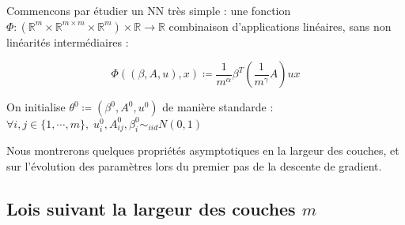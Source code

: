 \documentclass[a4paper, 11pt, french]{article}
\theoremstyle{definition}
\begin{document}
	Commencons par étudier un NN très simple : une fonction
	$\Phi : (\mathbb{R}^m \times \mathbb{R}^{m \times m} \times \mathbb{R}^m) \times \mathbb{R} \to \mathbb{R}$ combinaison d'applications linéaires, sans non linéarités  intermédiaires  :
	
	\[ \Phi ((\beta, A, u), x) \coloneqq \frac{1}{m^{\alpha}} \beta^T
		 \left( \frac{1}{m^{\gamma}} A \right) u x \]
		 
	On initialise $\theta^0 \coloneqq (\beta^0, A^0, u^0)$ de manière standarde : 
	$ \forall i,j \in \{1, \cdots, m\} , \; u_i^0, A_{ij}^0, \beta_i^0 \sim_{iid} N(0, 1)$
	
	Nous montrerons quelques propriétés asymptotiques en la largeur des couches, et sur l'évolution des paramètres lors du premier pas de la descente de gradient.
	
	\subsection{Lois suivant la largeur des couches $m$}
	
\end{document}
